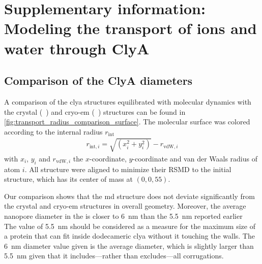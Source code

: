 \chapter[SI: Modeling the transport of ions and water through {ClyA}]%
        {Supplementary information: Modeling the transport of ions and water through {ClyA}}
%
\label{ch:transport_appendix}
%

\begin{shaded}
\newpage
\end{shaded}


\section{Comparison of the {ClyA} \lumen{} diameters}
%
\label{sec:transport_appendix:radius_comparision}
%

A comparison of the \gls{clya} structures equilibrated with molecular dynamics with the crystal
(~\cite{Mueller-2009}) and \gls{cryo-em} (~\cite{Peng-2019}) structures can be found
in \cref{fig:transport_radius_comparison_surface}. The molecular surface was colored according to the internal
radius $r_{\text{int}}$
%
\begin{align}\label{eq:internal_radius}
  r_{\text{int},i} = \sqrt{(x_i^2 + y_i^2)} - r_{\text{vdW},i}
\end{align}
%
with $x_i$, $y_i$ and $r_{\text{vdW},i}$ the $x$-coordinate, $y$-coordinate and van der Waals radius of atom
$i$. All structure were aligned to minimize their RSMD to the initial structure, which has its center of mass
at $(0,0,55)$.

Our comparison shows that the \gls{md} structure does not deviate significantly from the crystal and
\gls{cryo-em} structures in overall geometry. Moreover, the average nanopore diameter in the \cisi{} \lumen{}
is closer to \SI{6}{\nm} than the \SI{5.5}{\nm} reported earlier~\cite{Willems-Ruic-Biesemans-2019} The value
of \SI{5.5}{\nm} should be considered as a measure for the maximum size of a protein that can fit inside
dodecameric \gls{clya} without it touching the walls. The \SI{6}{\nm} diameter value given is the average
\lumen{} diameter, which is slightly larger than \SI{5.5}{\nm} given that it includes---rather than
excludes---all corrugations. 

